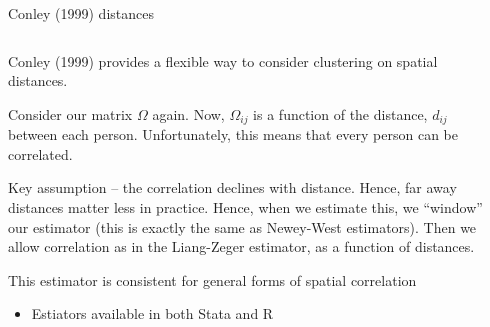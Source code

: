 \documentclass[notes,11pt, aspectratio=169]{beamer}
\newenvironment{wideitemize}{\itemize\addtolength{\itemsep}{10pt}}{\enditemize}
\begin{document}
\begin{frame}{Conley (1999) distances}
\begin{columns}[T] %
\begin{column}{.8\textwidth}
  \begin{wideitemize}
  \item Conley (1999) provides a flexible way to consider clustering on spatial distances.
  \item Consider our matrix $\Omega$ again. Now, $\Omega_{ij}$ is a
    function of the distance, $d_{ij}$ between each
    person. Unfortunately, this means that every person can be
    correlated.
  \item Key assumption -- the correlation declines with
    distance. Hence, far away distances matter less in
    practice. Hence, when we estimate this, we ``window'' our
    estimator (this is exactly the same as Newey-West
    estimators). Then we allow correlation as in the Liang-Zeger
    estimator, as a function of distances.
  \item This estimator is consistent for general forms of spatial
    correlation
    \begin{itemize}
    \item Estiators available in both Stata and R
    \end{itemize}
  \end{wideitemize}
  \end{column}%
  \hfill%
  \begin{column}{.5\textwidth}
  \end{column}
\end{columns}
  
\end{frame}
\end{document}
